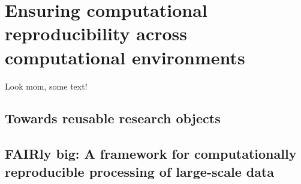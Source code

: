 


\chapter{Ensuring computational reproducibility across computational environments}
\label{chap:k3}

Look mom, some text!

\section{Towards reusable research objects}
\pagebreak

\section{FAIRly big: A framework for computationally reproducible processing of large-scale data}
\pagebreak